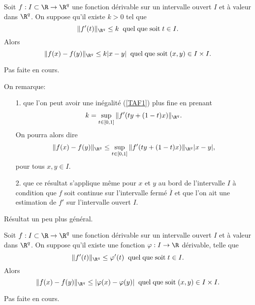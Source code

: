 \documentclass[class=report,crop=false]{standalone}
\begin{document}
 \begin{theoreme}
\textcolor[rgb]{0.44,0.00,0.87}{ 
   Soit $f: I \subset \R \rightarrow \R^q$ une fonction d\'erivable sur un intervalle ouvert $I$ et \`a valeur
   dans $\R^q$. On suppose qu'il existe $k>0$ tel que
   \begin{equation*}
     \|f'(t)\|_{\R^q} \leq k \;\mathrm{\;quel \; que \; soit\;}t\in I.
   \end{equation*}
   Alors
   \begin{equation}\label{TAF1}
     \|f(x)-f(y)\|_{\R^q} \leq k|x-y| \;\mathrm{\;quel \; que \; soit\;}(x,y)\in I\times I.
   \end{equation}}
 \end{theoreme}
     Pas faite en cours.
    
    
    \begin{remarque*}
 \textcolor[rgb]{0.00,0.00,1.00}{\label{remarqueTAF}
   On remarque:
   \begin{itemize}
     \item[1.]que l'on peut avoir une in\'egalit\'e (\ref{TAF1}) plus fine en prenant
   \begin{equation*}
     k=\displaystyle \sup_{t \in [0,1]} \| f'(ty+(1-t)x) \|_{\R^q}.
   \end{equation*}
   On pourra alors dire
   \begin{equation*}
   \| f(x)-f(y) \|_{\R^q} \leq \displaystyle \sup_{t \in [0,1]} \| f'(ty+(1-t)x) \|_{\R^q} |x-y|,
   \end{equation*}
   pour tous $x,y \in I$.
   \item[2.] que ce r\'esultat s'applique m\^eme pour $x$ et $y$ au bord de l'intervalle $I$ \`a condition que $f$ soit
       continue sur l'intervalle ferm\'e $\overline{I}$ et que l'on ait une estimation de $f'$ sur l'intervalle ouvert $I$.
\end{itemize}}
   \end{remarque*}


      \noindent  R\'esultat un peu plus g\'en\'eral.
\begin{theoreme}
 \textcolor[rgb]{0.44,0.00,0.87}{
     Soit $f: I \subset \R \rightarrow \R^q$ une fonction d\'erivable sur un intervalle ouvert $I$ et \`a valeur
   dans $\R^q$. On suppose qu'il existe une fonction $\varphi: I \rightarrow \R$ d\'erivable, telle que
    \begin{equation*}
     \|f'(t)\|_{\R^q} \leq \varphi'(t) \;\mathrm{\;quel \; que \; soit\;}t\in I.
   \end{equation*}
   Alors
    \begin{equation*}
     \|f(x)-f(y)\|_{\R^q} \leq |\varphi(x)-\varphi(y)| \;\mathrm{\;quel \; que \; soit\;}(x,y)\in I\times I.
   \end{equation*}}
 \end{theoreme}
     Pas faite en cours.
\end{document}
